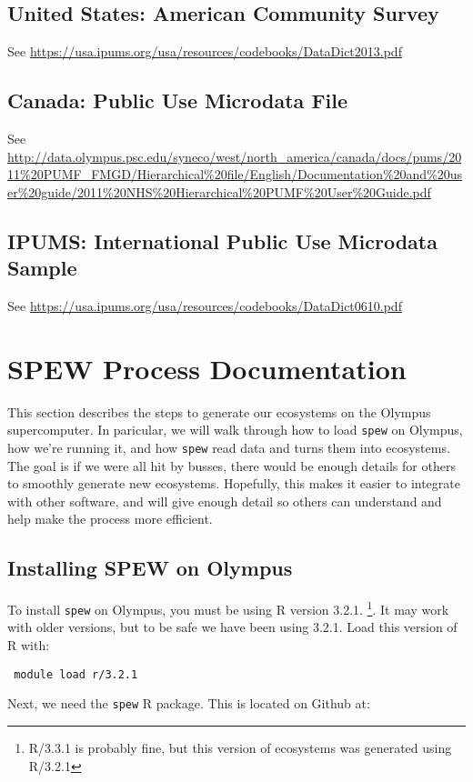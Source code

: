 \documentclass{article}
\begin{document}
\subsection{United States: American Community Survey}
	See \url{https://usa.ipums.org/usa/resources/codebooks/DataDict2013.pdf}

\subsection{Canada: Public Use Microdata File}
	See \url{http://data.olympus.psc.edu/syneco/west/north_america/canada/docs/pums/2011%20PUMF_FMGD/Hierarchical%20file/English/Documentation%20and%20user%20guide/2011%20NHS%20Hierarchical%20PUMF%20User%20Guide.pdf}

\subsection{IPUMS: International Public Use Microdata Sample}
	See \url{https://usa.ipums.org/usa/resources/codebooks/DataDict0610.pdf}


\newpage 
\section{SPEW Process Documentation}
This section describes the steps to generate our ecosystems on the Olympus supercomputer. In paricular, we will walk through how to load \verb|spew| on Olympus, how we're running it, and how \verb|spew| read data and turns them into ecosystems. The goal is if we were all hit by busses, there would be enough details for others to smoothly generate new ecosystems. Hopefully, this makes it easier to integrate with other software, and will give enough detail so others can understand and help make the process more efficient. 

\subsection{Installing SPEW on Olympus}
To install \verb|spew| on Olympus, you must be using R version 3.2.1. \footnote{R/3.3.1 is probably fine, but this version of ecosystems was generated using R/3.2.1}. It may work with older versions, but to be safe we have been using 3.2.1. Load this version of R with: 

\begin{verbatim} module load r/3.2.1 \end{verbatim}

Next, we need the \verb|spew| R package. This is located on Github at: \\
\end{document}
